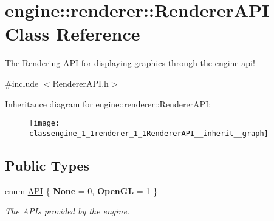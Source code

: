 \hypertarget{classengine_1_1renderer_1_1RendererAPI}{}\section{engine\+:\+:renderer\+:\+:Renderer\+A\+PI Class Reference}
\label{classengine_1_1renderer_1_1RendererAPI}


The Rendering A\+PI for displaying graphics through the engine api!  




{\ttfamily \#include $<$Renderer\+A\+P\+I.\+h$>$}



Inheritance diagram for engine\+:\+:renderer\+:\+:Renderer\+A\+PI\+:\nopagebreak
\begin{figure}[H]
\begin{center}
\leavevmode
\texttt{[image: classengine\_1\_1renderer\_1\_1RendererAPI\_\_inherit\_\_graph]}
\end{center}
\end{figure}
\subsection*{Public Types}
\begin{DoxyCompactItemize}
\item 
\mbox{\label{classengine_1_1renderer_1_1RendererAPI_a624c2793dc8b315466c36332bbc82ef0}} 
enum \hyperlink{classengine_1_1renderer_1_1RendererAPI_a624c2793dc8b315466c36332bbc82ef0}{A\+PI} \{ {\bfseries None} = 0, 
{\bfseries Open\+GL} = 1
 \}\begin{DoxyCompactList}\small\item\em The A\+P\+Is provided by the engine. \end{DoxyCompactList}
\end{DoxyCompactItemize}
